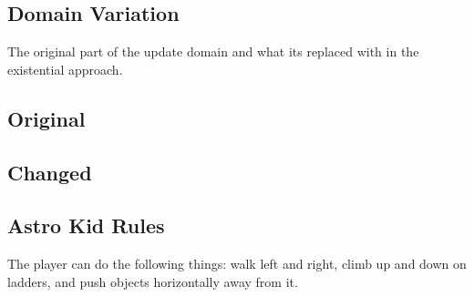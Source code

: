 \begin{appendices}
\lstset{tabsize=2}

\section{Domain Variation}\label{Domain_Variation}
The original part of the update domain and what its replaced with in the existential approach.
\subsection{Original}\label{domain}

\subsection{Changed}\label{domain2}


\subsection{Astro Kid Rules}

The player can do the following things: walk left and right, climb up and down on ladders, and push objects horizontally away from it.

\end{appendices}